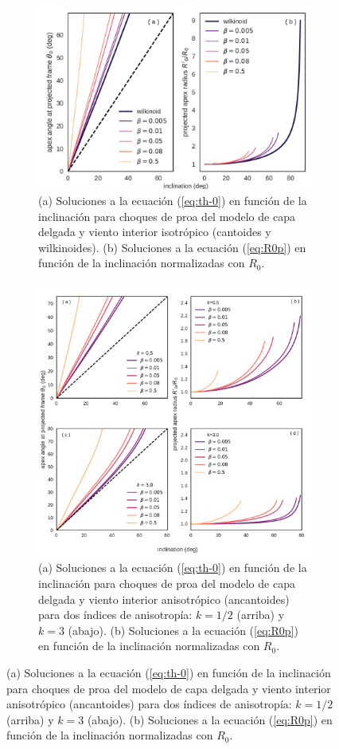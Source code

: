 \begin{figure}
\begin{figure}
  \centering
  \includegraphics[width=\linewidth]{./Figures/cantoid-th0-vs-i}
  \caption[$\theta_0$ y $R'_0$ en función de la inclinación para choques cantoides y wilkinoides.]{(a) Soluciones a la ecuación (\ref{eq:th-0}) en función de la inclinación para choques de proa del modelo de capa delgada y viento interior isotrópico (cantoides y wilkinoides). (b) Soluciones a la ecuación (\ref{eq:R0p}) en función de la inclinación normalizadas con $R_0$.}
  \label{fig:th0-isotropic}
\end{figure}

\begin{figure}
  \centering
  \includegraphics[width=\linewidth]{./Figures/ancantoid-th0-vs-i}
  \caption[$\theta_0$ y $R'_0$ en función de la inclinación para choques ancantoides.]{(a) Soluciones a la ecuación (\ref{eq:th-0}) en función de la inclinación para choques de proa del modelo de capa delgada y viento interior anisotrópico (ancantoides) para dos índices de anisotropía: $k=1/2$ (arriba) y $k=3$ (abajo). (b) Soluciones a la ecuación (\ref{eq:R0p}) en función de la inclinación normalizadas con $R_0$.}
  \label{fig:th0-anisotropic}
\end{figure}


\end{figure}
